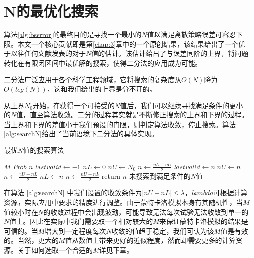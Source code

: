 \section{N的最优化搜索}
\label{sec:researchN}
算法\ref{alg:bserror}的最终目的是寻找一个最小的$N$值以满足离散策略误差可容忍下限。本文一个核心贡献即是第\ref{chap:3}章中的一个原创结果，该结果给出了一个优于以往任何文献发表的对于$N$值的估计。该估计给出了与误差同阶的上界，将问题转化在有限闭区间中最优解的搜索，使得二分法的应用成为可能。

二分法广泛应用于各个科学工程领域，它将搜索的复杂度从$O(N)$降为$O(log(N))$，这和我们给出的上界是分不开的。

从上界$N_0$开始，在获得一个可接受的$N$值后，我们可以继续寻找满足条件的更小的$N$值，直至算法收敛。二分的过程其实就是不断修正搜索的上界和下界的过程。当上界和下界的差值小于我们预设的门限，则判定算法收敛，停止搜索。算法\ref{alg:searchN}给出了当前语境下二分法的具体实现。
\begin{algorithm}
	\caption{最优$N$值的搜索算法}
	\label{alg:searchN}
	\begin{algorithmic}[1]
	  \Require $M$ 
          \Require $Prob$ 
          \Ensure $n$ 
	   
          \State $lastvalid \gets -1$ 
	  \State $nL \gets 0$  
	  \State $nU \gets N_0$ 
	  \State $n \gets \frac{nL + nU}{2}$
	   
          \State $lastvalid \gets n$
	  \State $nU \gets n$
	  \State $n \gets \frac{nU + nL}{2}$		
	  \Else  {}
	  \State $nL \gets n$
	  \State $n \gets \frac{nU + nL}{2}$
	  \EndIf
	  \EndWhile
	  \State return $n$
          \Else 
          \State $未搜索到满足条件的N值$ 
          \EndIf 
	  \EndProcedure
	\end{algorithmic}
\end{algorithm}
在算法 \ref{alg:searchN} 中我们设置的收敛条件为$|nU - nL| \le \lambda$，$lambda$可根据计算资源，实际应用中要求的精度进行调整。由于蒙特卡洛模拟本身有其随机性，当$M$值较小时在$N$的收敛过程中会出现波动，可能导致无法每次试验无法收敛到单一的$N$值上。因此在实际中我们需要取一个相对较大的$M$来保证蒙特卡洛模拟的结果是可信的。当$M$增大到一定程度每次$N$收敛的值趋于稳定，我们可认为该$M$值是有效的。当然，更大的$M$值从数值上带来更好的近似程度，然而却需要更多的计算资源。关于如何选取一个合适的$M$详见下章。

